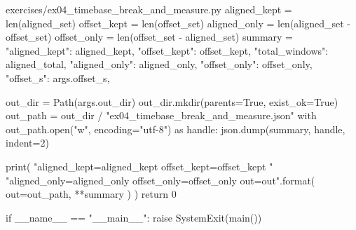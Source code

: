 \documentclass[11pt,openany]{book}
\begin{document}
\begin{filecontents*}{exercises/ex04_timebase_break_and_measure.py}
    aligned_kept = len(aligned_set)
    offset_kept = len(offset_set)
    aligned_only = len(aligned_set - offset_set)
    offset_only = len(offset_set - aligned_set)
    summary = {
        "aligned_kept": aligned_kept,
        "offset_kept": offset_kept,
        "total_windows": aligned_total,
        "aligned_only": aligned_only,
        "offset_only": offset_only,
        "offset_s": args.offset_s,
    }

    out_dir = Path(args.out_dir)
    out_dir.mkdir(parents=True, exist_ok=True)
    out_path = out_dir / "ex04_timebase_break_and_measure.json"
    with out_path.open("w", encoding="utf-8") as handle:
        json.dump(summary, handle, indent=2)

    print(
        "aligned_kept={aligned_kept} offset_kept={offset_kept} "
        "aligned_only={aligned_only} offset_only={offset_only} out={out}".format(
            out=out_path, **summary
        )
    )
    return 0


if __name__ == "__main__":
    raise SystemExit(main())
\end{filecontents*}
\end{document}
